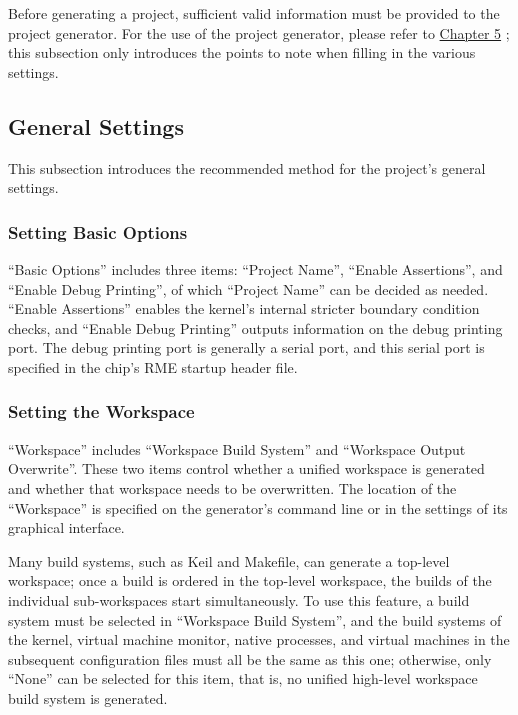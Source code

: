 Before generating a project, sufficient valid information must be provided to the project generator. For the use of the project generator, please refer to \protect\hyperref[sec:5-1]{Chapter 5}
; this subsection only introduces the points to note when filling in the various settings.

\subsection{General Settings}\label{subsec:6-5-1}

This subsection introduces the recommended method for the project's general settings.

\subsubsection{Setting Basic Options}\label{subsubsec:6-5-1-1}

``Basic Options'' includes three items: ``Project Name'', ``Enable Assertions'', and ``Enable Debug Printing'', of which ``Project Name'' can be decided as needed. ``Enable Assertions'' enables the kernel's internal stricter boundary condition checks, and ``Enable Debug Printing'' outputs information on the debug printing port. The debug printing port is generally a serial port, and this serial port is specified in the chip's RME startup header file.

\subsubsection{Setting the Workspace}\label{subsubsec:6-5-1-2}

``Workspace'' includes ``Workspace Build System'' and ``Workspace Output Overwrite''. These two items control whether a unified workspace is generated and whether that workspace needs to be overwritten. The location of the ``Workspace'' is specified on the generator's command line or in the settings of its graphical interface.

Many build systems, such as Keil and Makefile, can generate a top-level workspace; once a build is ordered in the top-level workspace, the builds of the individual sub-workspaces start simultaneously. To use this feature, a build system must be selected in ``Workspace Build System'', and the build systems of the kernel, virtual machine monitor, native processes, and virtual machines in the subsequent configuration files must all be the same as this one; otherwise, only ``None'' can be selected for this item, that is, no unified high-level workspace build system is generated.

